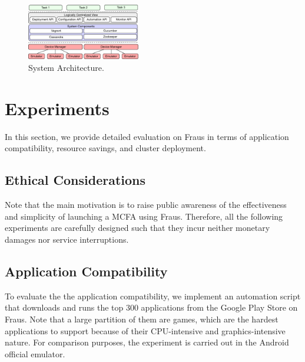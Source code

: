 \documentclass[conference]{IEEEtranl}
\begin{document}
	\begin{figure}[tb]
	\begin{center}
	\includegraphics[width=0.44\textwidth]{Figures/networkarchitecture}
	\caption{System Architecture.}
	\label{fig:deploy}
	\vspace{-0.3in}
	\end{center}
	\end{figure}











	\section{Experiments}\label{expm}
	In this section, we provide detailed evaluation on Fraus in terms of application compatibility, resource savings, and cluster deployment. 


	\subsection{Ethical Considerations}
	Note that the main motivation is to raise public awareness of the effectiveness and simplicity of launching a MCFA using Fraus. Therefore, all the following experiments are carefully designed such that they incur neither monetary damages nor service interruptions.



	\subsection{Application Compatibility} 
	To evaluate the the application compatibility, we implement an automation script that downloads and runs the top 300 applications from the Google Play Store on Fraus. Note that a large partition of them are games, which are the hardest applications to support because of their CPU-intensive and graphics-intensive nature. For comparison purposes, the experiment is carried out in the Android official emulator. 
\end{document}
